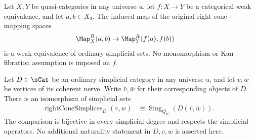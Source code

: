 \begin{resultblock}
\begin{theorem}
Let $X,Y$ be quasi-categories in any universe $u$, let $f:X\to Y$ be a
categorical weak equivalence, and let $a,b\in X_0$.
The induced map of the original right-cone mapping spaces
\begin{align}
 \Map^{R}_{X}(a,b)
  &\to \Map^{R}_{Y}(f(a),f(b))
\end{align}
is a weak equivalence of ordinary simplicial sets.
No monomorphism or Kan-fibration assumption is imposed on $f$.
\end{theorem}
\end{resultblock}

\begin{resultblock}
\begin{theorem}
Let $D\in\sCat$ be an ordinary simplicial category in any universe $u$,
and let $v,w$ be vertices of its coherent nerve.
Write $\bar v,\bar w$ for their corresponding objects of $D$.
There is an isomorphism of simplicial sets
\begin{align}
 \operatorname{rightConeSimplices}_{D}(v,w)
  &\cong \operatorname{Sing}_{Q_{\mathrm{rc}}}(D(\bar v,\bar w)).
\end{align}
The comparison is bijective in every simplicial degree and respects the
simplicial operators.
No additional naturality statement in $D,v,w$ is asserted here.
\end{theorem}
\end{resultblock}
